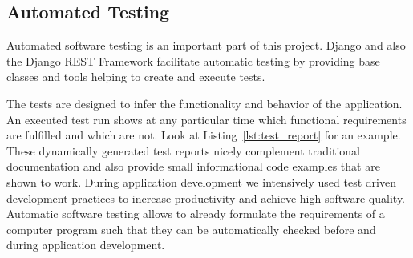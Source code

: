 \subsection{Automated Testing}

Automated software testing is an important part of this project. Django and also the Django REST Framework facilitate automatic testing by providing base classes and tools helping to create and execute tests.

The tests are designed to infer the functionality and behavior of the application.
An executed test run shows at any particular time which functional requirements are fulfilled and which are not.
Look at Listing~\ref{lst:test_report} for an example.
These dynamically generated test reports nicely complement traditional documentation and also provide small informational code examples that are shown to work.
During application development we intensively used test driven development practices to increase productivity and achieve high software quality.
Automatic software testing allows to already formulate the requirements of a computer program such that they can be automatically checked before and during application development.



